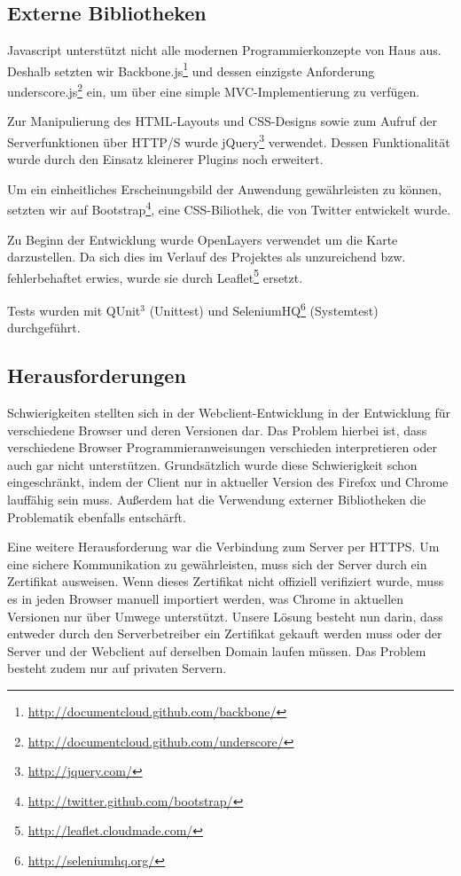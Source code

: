 \subsection*{Externe Bibliotheken}

Javascript unterstützt nicht alle modernen Programmierkonzepte von Haus aus.
Deshalb setzten wir Backbone.js\footnote{\url{http://documentcloud.github.com/backbone/}} und dessen einzigste Anforderung underscore.js\footnote{\url{http://documentcloud.github.com/underscore/}} ein, um über eine simple MVC-Implementierung zu verfügen.

Zur Manipulierung des HTML-Layouts und CSS-Designs sowie zum Aufruf der Serverfunktionen über HTTP/S wurde jQuery\footnote{\url{http://jquery.com/}} verwendet.
Dessen Funktionalität wurde durch den Einsatz kleinerer Plugins noch erweitert.

Um ein einheitliches Erscheinungsbild der Anwendung gewährleisten zu können, setzten wir auf Bootstrap\footnote{\url{http://twitter.github.com/bootstrap/}}, eine CSS-Biliothek, die von Twitter entwickelt wurde.

Zu Beginn der Entwicklung wurde OpenLayers verwendet um die Karte darzustellen. 
Da sich dies im Verlauf des Projektes als unzureichend bzw. fehlerbehaftet erwies, wurde sie durch Leaflet\footnote{\url{http://leaflet.cloudmade.com/}} ersetzt.

Tests wurden mit QUnit$^3$ (Unittest) und SeleniumHQ\footnote{\url{http://seleniumhq.org/}} (Systemtest) durchgeführt.

\subsection*{Herausforderungen}

Schwierigkeiten stellten sich in der Webclient-Entwicklung in der Entwicklung für verschiedene Browser und deren Versionen dar.
Das Problem hierbei ist, dass verschiedene Browser Programmieranweisungen verschieden interpretieren oder auch gar nicht unterstützen. 
Grundsätzlich wurde diese Schwierigkeit schon eingeschränkt, indem der Client nur in aktueller Version des Firefox und Chrome lauffähig sein muss. Außerdem hat die Verwendung externer Bibliotheken die Problematik ebenfalls entschärft.

Eine weitere Herausforderung war die Verbindung zum Server per HTTPS.
Um eine sichere Kommunikation zu gewährleisten, muss sich der Server durch ein Zertifikat ausweisen.
Wenn dieses Zertifikat nicht offiziell verifiziert wurde, muss es in jeden Browser manuell importiert werden, was Chrome in aktuellen Versionen nur über Umwege unterstützt.
Unsere Lösung besteht nun darin, dass entweder durch den Serverbetreiber ein Zertifikat gekauft werden muss oder der Server und der Webclient auf derselben Domain laufen müssen.
Das Problem besteht zudem nur auf privaten Servern.
